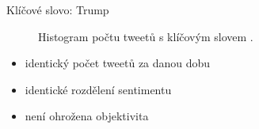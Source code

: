 \documentclass[notheorems,12pt]{beamer}
\begin{document}
\begin{frame}{Klíčové slovo: Trump}
    \begin{figure}
        \centering
        \vspace{-0.7cm}
        \caption*{Histogram počtu tweetů s klíčovým slovem \textit{}.}
    \end{figure}
	\begin{itemize}
		\item identický počet tweetů za danou dobu
        \item identické rozdělení sentimentu
        \item není ohrožena objektivita
	\end{itemize}
\end{frame}
\end{document}
